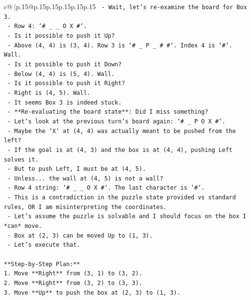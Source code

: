 \documentclass{article}
\begin{document}
{\begin{supertabular}{c@{$\;$}|p{.15\linewidth}@{}p{.15\linewidth}p{.15\linewidth}p{.15\linewidth}p{.15\linewidth}p{.15\linewidth}}
{{{\texttt{    {-}   Wait, let's re{-}examine the board for Box 3.} \\
\texttt{    {-}   Row 4: `\# \_ \_ O X \#`.} \\
\texttt{    {-}   Is it possible to push it Up?} \\
\texttt{        {-}   Above (4, 4) is (3, 4). Row 3 is `\# \_ P \_ \# \#`. Index 4 is `\#`. Wall.} \\
\texttt{    {-}   Is it possible to push it Down?} \\
\texttt{        {-}   Below (4, 4) is (5, 4). Wall.} \\
\texttt{    {-}   Is it possible to push it Right?} \\
\texttt{        {-}   Right is (4, 5). Wall.} \\
\texttt{    {-}   It seems Box 3 is indeed stuck.} \\
\texttt{    {-}   **Re{-}evaluating the board state**: Did I miss something?} \\
\texttt{    {-}   Let's look at the previous turn's board again: `\# \_ P O X \#`.} \\
\texttt{    {-}   Maybe the `X` at (4, 4) was actually meant to be pushed from the left?} \\
\texttt{    {-}   If the goal is at (4, 3) and the box is at (4, 4), pushing Left solves it.} \\
\texttt{    {-}   But to push Left, I must be at (4, 5).} \\
\texttt{    {-}   Unless... the wall at (4, 5) is not a wall?} \\
\texttt{    {-}   Row 4 string: `\# \_ \_ O X \#`. The last character is `\#`.} \\
\texttt{    {-}   This is a contradiction in the puzzle state provided vs standard rules, OR I am misinterpreting the coordinates.} \\
\texttt{    {-}   Let's assume the puzzle is solvable and I should focus on the box I *can* move.} \\
\texttt{    {-}   Box at (2, 3) can be moved Up to (1, 3).} \\
\texttt{    {-}   Let's execute that.} \\
\\ 
\texttt{**Step{-}by{-}Step Plan:**} \\
\texttt{1.  Move **Right** from (3, 1) to (3, 2).} \\
\texttt{2.  Move **Right** from (3, 2) to (3, 3).} \\
\texttt{3.  Move **Up** to push the box at (2, 3) to (1, 3).} \\
}}}
\end{supertabular}}
\end{document}

